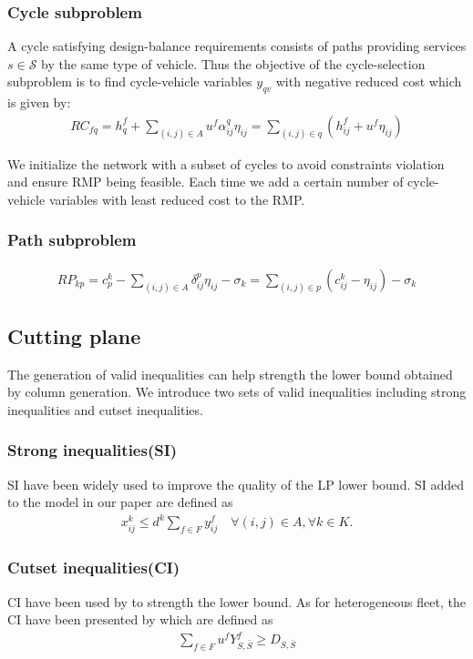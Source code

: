 \documentclass[11pt,nonblindrev,fleqn]{article}
\begin{document}
\subsubsection{Cycle subproblem}
A cycle satisfying design-balance requirements consists of paths providing services $s\in \mathscr{S}$ by the same type of vehicle. Thus the objective of the cycle-selection subproblem is to find cycle-vehicle variables $y_{qv}$ with negative reduced cost which is given by:
\begin{align}
RC_{fq} = h_q^f + \sum_{(i,j)\in A} u^f \alpha_{ij}^q \eta_{ij} = \sum_{(i,j)\in q} (h_{ij}^f + u^f \eta_{ij})
\end{align}

We initialize the network with a subset of cycles to avoid constraints violation and ensure RMP being feasible. Each time we add a certain number of cycle-vehicle variables with least reduced cost to the RMP.

\subsubsection{Path subproblem}

\begin{align}
RP_{kp} = c_p^k - \sum_{(i,j)\in A} \delta_{ij}^p \eta_{ij} - \sigma_k = \sum_{(i,j)\in p} (c_{ij}^k - \eta_{ij}) - \sigma_k
\end{align}

\subsection{Cutting plane}
The generation of valid inequalities can help strength the lower bound obtained by column generation. We introduce two sets of valid inequalities including strong inequalities and cutset inequalities.

\subsubsection{Strong inequalities(SI)}
SI have been widely used to improve the quality of the LP lower bound. SI added to the model in our paper are defined as
\begin{align}
  x_{ij}^k \leq d^k \sum_{f\in F} y_{ij}^f      \quad       \forall (i,j)\in A, \forall k\in K.
\end{align}

\subsubsection{Cutset inequalities(CI)}
CI have been used by \cite{Chouman2015Cutting} to strength the lower bound. As for heterogeneous fleet, the CI have been presented by \cite{Kim1999Multimodal} which are defined as
\begin{align}
    \sum_{f\in F}u^f Y_{S,\bar{S}}^f \geq  D_{S,\bar{S}}
\end{align}
\end{document}
